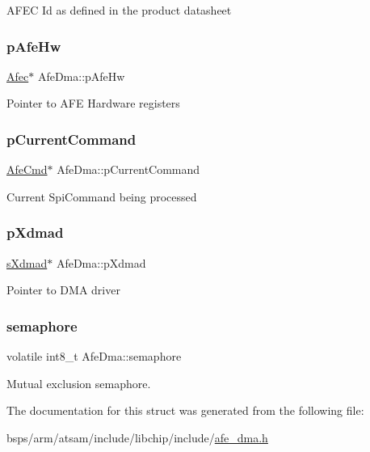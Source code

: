 A\+F\+EC Id as defined in the product datasheet \mbox{\label{structAfeDma_a2caf18e72f15ee510412c7ffbc52c070}} 
\subsubsection{\texorpdfstring{pAfeHw}{pAfeHw}}
{\footnotesize\ttfamily \mbox{\hyperlink{structAfec}{Afec}}$\ast$ Afe\+Dma\+::p\+Afe\+Hw}

Pointer to A\+FE Hardware registers \mbox{\label{structAfeDma_a48faf82abbde9b3ba4520911de816ec4}} 
\subsubsection{\texorpdfstring{pCurrentCommand}{pCurrentCommand}}
{\footnotesize\ttfamily \mbox{\hyperlink{structAfeCmd}{Afe\+Cmd}}$\ast$ Afe\+Dma\+::p\+Current\+Command}

Current Spi\+Command being processed \mbox{\label{structAfeDma_a5b8d94d12d12890b15e2515fb41213ae}} 
\subsubsection{\texorpdfstring{pXdmad}{pXdmad}}
{\footnotesize\ttfamily \mbox{\hyperlink{group__dmad__structs_gaf2c13151514615a6beb35c0d868a5053}{s\+Xdmad}}$\ast$ Afe\+Dma\+::p\+Xdmad}

Pointer to D\+MA driver \mbox{\label{structAfeDma_ab3a539365c98c6c0a4095943f0504295}} 
\subsubsection{\texorpdfstring{semaphore}{semaphore}}
{\footnotesize\ttfamily volatile int8\+\_\+t Afe\+Dma\+::semaphore}

Mutual exclusion semaphore. 

The documentation for this struct was generated from the following file\+:\begin{DoxyCompactItemize}
\item 
bsps/arm/atsam/include/libchip/include/\mbox{\hyperlink{afe__dma_8h}{afe\+\_\+dma.\+h}}\end{DoxyCompactItemize}

